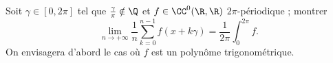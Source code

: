 \begin{enonce}
\begin{exercise}[ID={Cahier RMS 5 E149 X},subtitle={},tags={}, difficulty={0}]
  Soit $\gamma\in[0,2\pi]$ tel que $\frac\gamma\pi\notin\Q$ et $f\in\CC^0(\R,\R)$ $2\pi$-périodique ; montrer
  \begin{equation*}
    \lim_{n\to+\infty} \frac1n\sum_{k=0}^{n-1} f(x+k\gamma)=\frac1{2\pi}\int_0^{2\pi} f.
  \end{equation*}
  On envisagera d'abord le cas où $f$ est un polynôme trigonométrique.
\end{exercise}
\begin{solution}
\end{solution}
\end{enonce}
